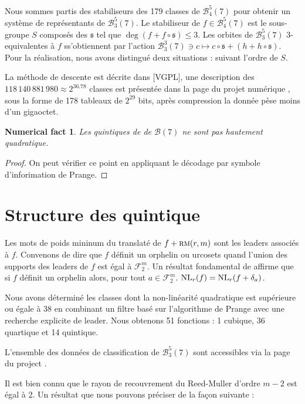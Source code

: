 \documentclass[11pt,a4paper]{article}
\def\bst(#1,#2,#3){\mathcal{B}_{#1}^{#2}(#3)}
\def\NL(#1,#2){ {\rm NL}_{#1}(#2) }
\def\agl#1{ {\mathfrak #1 }}
\def\rmc(#1,#2){ \textsc {rm}(#1,#2) }
\def\boole(#1){\mathcal{B}(#1)}
\def\fd(#1){\mathcal{F}_2^{#1}}
\theoremstyle{plain}
\newtheorem{result}[theorem]{Numerical fact}
\theoremstyle{definition}
\theoremstyle{remark}
\begin{document}
Nous sommes partis des stabiliseurs des 179 classes  de $\bst(4,5,7)$ pour obtenir un système
de représentants de $\bst(3,5,7)$.   Le stabiliseur
de $f\in\bst(4,5,7)$ est le sous-groupe $S$ composés des  $\agl s$ tel que $\deg( f + f\circ \agl s ) \leq 3$.
Les orbites de $\bst(3,5,7)$ 3-equivalentes à $f$ ss'obtiennent par l'action 
$\bst(3,3,7)\ni c\mapsto  c\circ \agl s +( h + h\circ \agl s)$. Pour la réalisation, nous
avons distingué deux situations : suivant l'ordre de $S$.

La méthode de descente est décrite dans [VGPL],
une description des  $118\,140\,881\,980\approx 2^{36.78}$ 
classes est présentée dans la page du projet numérique \cite{PN}, 
sous la forme de 178 tableaux de $2^{29}$ bits, après  compression 
la donnée pèse moins d'un gigaoctet. 



\begin{result}
	Les quintiques de de $\boole(7)$ ne sont pas hautement quadratique.   
\end{result}
\begin{proof} On peut vérifier ce point en appliquant le décodage par symbole d'inforimation de Prange.
\end{proof}

\section{Structure des quintique}

Les mots de poids mininum du translaté de $f+\rmc(r,m)$ sont
les leaders associés à $f$. Convenons de dire que $f$ définit
un orphelin ou urcosets quand l'union des supports des leaders 
de $f$ est égal à $\fd(m)$. Un résultat fondamental de \cite{BRUALDI}
affirme que si $f$ définit un orphelin alors, pour tout $a\in\fd(m)$.
$\NL(r,f) = \NL(r,f+\delta_a)$.

Nous avons déterminé les classes dont la non-linéarité
quadratique est supérieure ou égale à 38 en combinant un 
filtre basé sur l'algorithme de
Prange avec une recherche explicite de leader.  Nous obtenons
51 fonctions : 1 cubique,  36 quartique et 14 quintique.  

L'ensemble des données de classification 
de $\bst(3,5,7)$ sont accessibles via la
page du project \cite{GL26}.

Il est bien connu que le rayon de recouvrement du Reed-Muller d'ordre
$m-2$ est égal à 2. Un résultat que nous pouvons préciser de la 
façon suivante :
\end{document}
